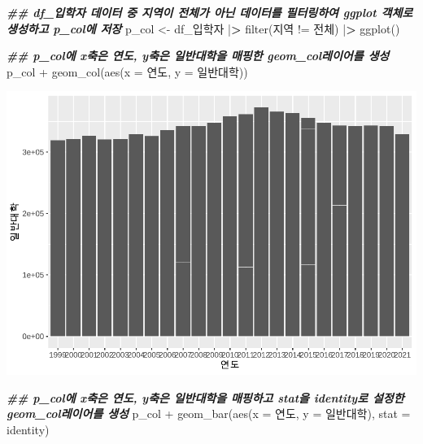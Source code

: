 \documentclass[
]{article}
\newenvironment{Shaded}{\begin{snugshade}}{\end{snugshade}}
\newcommand{\AttributeTok}[1]{\textcolor[rgb]{0.77,0.63,0.00}{#1}}
\newcommand{\DocumentationTok}[1]{\textcolor[rgb]{0.56,0.35,0.01}{\textbf{\textit{#1}}}}
\newcommand{\ErrorTok}[1]{\textcolor[rgb]{0.64,0.00,0.00}{\textbf{#1}}}
\newcommand{\FunctionTok}[1]{\textcolor[rgb]{0.00,0.00,0.00}{#1}}
\newcommand{\NormalTok}[1]{#1}
\newcommand{\OtherTok}[1]{\textcolor[rgb]{0.56,0.35,0.01}{#1}}
\newcommand{\SpecialCharTok}[1]{\textcolor[rgb]{0.00,0.00,0.00}{#1}}
\newcommand{\StringTok}[1]{\textcolor[rgb]{0.31,0.60,0.02}{#1}}
\begin{document}
\begin{Shaded}
\begin{Highlighting}[]
\DocumentationTok{\#\#  df\_입학자 데이터 중 지역이 전체가 아닌 데이터를 필터링하여 ggplot 객체로 생성하고 p\_col에 저장}
\NormalTok{p\_col }\OtherTok{\textless{}{-}}\NormalTok{ df\_입학자 }\SpecialCharTok{|}\ErrorTok{\textgreater{}} \FunctionTok{filter}\NormalTok{(지역 }\SpecialCharTok{!=} \StringTok{\textquotesingle{}전체\textquotesingle{}}\NormalTok{) }\SpecialCharTok{|}\ErrorTok{\textgreater{}}
  \FunctionTok{ggplot}\NormalTok{()}

\DocumentationTok{\#\#  p\_col에 x축은 연도, y축은 일반대학을 매핑한 geom\_col레이어를 생성}
\NormalTok{p\_col }\SpecialCharTok{+}
  \FunctionTok{geom\_col}\NormalTok{(}\FunctionTok{aes}\NormalTok{(}\AttributeTok{x =}\NormalTok{ 연도, }\AttributeTok{y =}\NormalTok{ 일반대학))}
\end{Highlighting}
\end{Shaded}

\includegraphics{chap3_files/figure-latex/unnamed-chunk-36-1.pdf}

\begin{Shaded}
\begin{Highlighting}[]
\DocumentationTok{\#\#  p\_col에 x축은 연도, y축은 일반대학을 매핑하고 stat을 \textquotesingle{}identity\textquotesingle{}로 설정한 geom\_col레이어를 생성}
\NormalTok{p\_col }\SpecialCharTok{+}
  \FunctionTok{geom\_bar}\NormalTok{(}\FunctionTok{aes}\NormalTok{(}\AttributeTok{x =}\NormalTok{ 연도, }\AttributeTok{y =}\NormalTok{ 일반대학), }\AttributeTok{stat =} \StringTok{\textquotesingle{}identity\textquotesingle{}}\NormalTok{)}
\end{Highlighting}
\end{Shaded}
\end{document}
